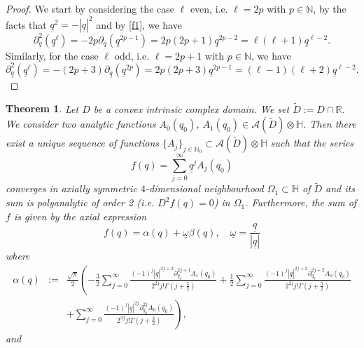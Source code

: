 \documentclass[reqno,11pt]{amsart}
\numberwithin{equation}{section}
\newtheorem{theorem}{Theorem}[section]
\theoremstyle{definition}
\begin{document}
\begin{proof}

We start by considering the case $\ell$ even, i.e. $\ell=2p$ with $p \in \mathbb{N}$, by the facts that $\underline{q}^2=-| \underline{q}|^2$ and by \eqref{f1}, we have
	$$ \partial_{\underline{q}}^2(\underline{q}^\ell)=-2p\partial_{\underline{q}} \left( \underline{q}^{2p-1}\right)=2p(2p+1)\underline{q}^{2p-2}=\ell(\ell+1) \underline{q}^{\ell-2}.$$
	Similarly, for the case $\ell$ odd, i.e. $\ell=2p+1$ with $p \in \mathbb{N}$, we have
	$$ \partial_{\underline{q}}^2(\underline{q}^\ell)=-(2p+3) \partial_{\underline{q}}(\underline{q}^{2p})=2p(2p+3) \underline{q}^{2p-1}=(\ell-1)(\ell+2) \underline{q}^{\ell-2}.$$
\end{proof}



	
\begin{theorem}
\label{pgck}
Let $D$ be a convex intrinsic complex domain. We set $\tilde{D}:=D \cap \mathbb{R}$. We consider two analytic functions $A_0(q_0)$, $A_1(q_0) \in \mathcal{A}(\tilde{D}) \otimes \mathbb{H}$. Then there exist a unique sequence of functions $ \{A_j\}_{j \in \mathbb{N}_0} \subset \mathcal{A}(\tilde{D}) \otimes \mathbb{H}$ such that the series
\begin{equation}
\label{fun1}
f(q)= \sum_{j=0}^{\infty} \underline{q}^jA_j(q_0)
\end{equation}
converges in axially symmetric $4$-dimensional neighbourhood $\Omega_1 \subset \mathbb{H}$ of $\tilde{D}$ and its sum is polyanalytic of order 2 (i.e. $D^2 f(q)=0$) in $\Omega_1$. Furthermore, the sum of $f$ is given by the axial expression
\begin{equation}
\label{funct}
f(q)= \alpha(q)+\underline{\omega} \beta(q), \quad \underline{\omega}=\frac{\underline{q}}{|\underline{q}|}
\end{equation}
where
\begin{eqnarray}
	\nonumber
	\alpha(q)&:=& \frac{\sqrt{\pi}}{2}\left(-\frac{3}{2}  \sum_{j=0}^{\infty} \frac{(-1)^j |\underline{q}|^{2j+2} \partial_{q_0}^{2j+1} A_1(q_0)}{2^{2 j} j! \Gamma \left(j+\frac{5}{2}\right)} + \frac{1}{2}  \sum_{j=0}^{\infty} \frac{(-1)^j |\underline{q}|^{2j+2} \partial_{q_0}^{2j+2}A_0(q_0)}{2^{2j} j! \Gamma \left(j+\frac{5}{2}\right)} \right.\\
	\label{real}
	&&\left.+ \sum_{j=0}^\infty \frac{(-1)^j |\underline{q}|^{2j} \partial_{q_0}^{2j} A_0(q_0)}{2^{2j}j! \Gamma \left(j+\frac{3}{2}\right)} \right),
\end{eqnarray}
and
\begin{eqnarray}

\end{eqnarray}
\end{theorem}
\end{document}
